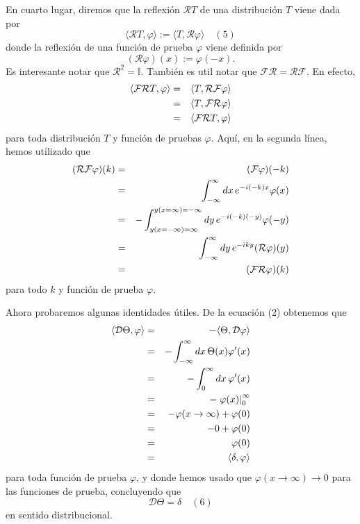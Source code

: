 \documentclass[11pt,spanish]{article}
\newcommand{\four}{\mathcal{F}}
\newcommand{\refl}{\mathcal{R}}
\newcommand{\derv}{\mathcal{D}}
\newcommand{\II}{\mathbb{I}}
\begin{document}
En cuarto lugar, diremos que la reflexi\'on $\refl T$ de una distribuci\'on $T$ viene dada por
$$
\langle \refl T,\varphi \rangle
:=
\langle T,\refl \varphi \rangle
\quad (5)
$$
donde la reflexi\'on de una funci\'on de prueba $\varphi$ viene definida por
$$
(\refl \varphi)(x) := \varphi(-x).
$$
Es interesante notar que $\refl^2 = \II$.
Tambi\'en es util notar que $\four \refl = \refl \four$.
En efecto,
\begin{eqnarray}
\langle \four \refl T , \varphi \rangle
&=&
\langle T , \refl \four \varphi \rangle
\notag
\\
&=&
\langle T , \four \refl \varphi \rangle
\notag
\\
&=&
\langle \four \refl T , \varphi \rangle
\notag
\end{eqnarray}
para toda distribuci\'on $T$ y funci\'on de pruebas $\varphi$.
Aqu\'i, en la segunda l\'inea, hemos utilizado que
\begin{eqnarray}
(\refl \four \varphi)(k)
&=&
(\four \varphi)(-k)
\notag
\\
&=&
\int_{-\infty}^{\infty}
dx\,
e^{-i(-k)x}
\varphi(x)
\notag
\\
&=&
-
\int_{y(x=-\infty)=\infty}^{y(x=\infty)=-\infty}
dy\,
e^{-i(-k)(-y)}
\varphi(-y)
\notag
\\
&=&
\int_{-\infty}^{\infty}
dy\,
e^{-iky}
(\refl \varphi)(y)
\notag
\\
&=&
(\four \refl \varphi)(k)
\notag
\end{eqnarray}
para todo $k$ y funci\'on de prueba $\varphi$.

Ahora probaremos algunas identidades \'utiles.
De la ecuaci\'on (2) obtenemos que
\begin{eqnarray}
\langle \derv \Theta , \varphi \rangle
&=&
-
\langle \Theta , \derv \varphi \rangle
\notag
\\
&=&
-
\int_{-\infty}^{\infty} dx\,
\Theta(x) \varphi'(x)
\notag
\\
&=&
-
\int_{0}^{\infty} dx\,
\varphi'(x)
\notag
\\
&=&
-
\left.
\varphi(x)
\right|_{0}^{\infty}
\notag
\\
&=&
-
\varphi(x\to \infty)
+
\varphi(0)
\notag
\\
&=&
-
0
+
\varphi(0)
\notag
\\
&=&
\varphi(0)
\notag
\\
&=&
\langle \delta , \varphi \rangle
\notag
\end{eqnarray}
para toda funci\'on de prueba $\varphi$, y donde hemos usado que $\varphi(x\to \infty)\to 0$ para las funciones de prueba, concluyendo que
$$
\derv \Theta = \delta
\quad (6)
$$
en sentido distribucional.
\end{document}
